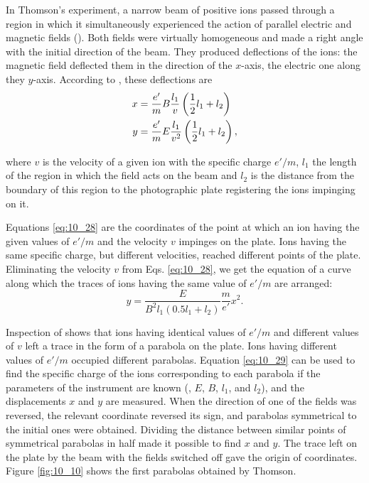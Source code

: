 In Thomson's experiment, a narrow beam of positive ions passed through a region in which it simultaneously experienced the action of parallel electric and magnetic fields ().
Both fields were virtually homogeneous and made a right angle with the initial direction of the beam.
They produced deflections of the ions: the magnetic
field deflected them in the direction of the $x$-axis, the electric one along they $y$-axis.
According to , these deflections
are
\begin{equation}\label{eq:10_28}
    \begin{split}
        x &= \frac{e'}{m} B \frac{l_1}{v} \left(\frac{1}{2} l_1 + l_2\right)\\
        y &= \frac{e'}{m} E \frac{l_1}{v^2} \left(\frac{1}{2} l_1 + l_2\right),
    \end{split}
\end{equation}

\noindent
where $v$ is the velocity of a given ion with the specific charge $e'/m$, $l_1$ the length of the region in which the field acts on the beam and $l_2$ is the distance from the boundary of this region to the photographic plate registering the ions impinging on it.

Equations \eqref{eq:10_28} are the coordinates of the point at which an ion having the given values of $e'/m$ and the velocity $v$ impinges on the plate.
Ions having the same specific charge, but different velocities, reached different points of the plate.
Eliminating the velocity $v$ from Eqs. \eqref{eq:10_28}, we get the equation of a curve along which the traces of ions having the same value of $e'/m$ are arranged:
\begin{equation}\label{eq:10_29}
    y = \frac{E}{B^2 l_1 (0.5 l_1 + l_2)} \frac{m}{e'} x^2.
\end{equation}

Inspection of  shows that ions having identical values of $e'/m$ and different values of $v$ left a trace in the form of a parabola on the plate.
Ions having different values of $e'/m$ occupied different parabolas.
Equation \eqref{eq:10_29} can be used to find the specific charge of the ions corresponding to each parabola if the parameters of the instrument are known (\ie, $E$, $B$, $l_1$, and $l_2$), and the displacements $x$ and $y$ are measured.
When the direction of one of the fields was reversed, the relevant coordinate reversed its sign, and parabolas symmetrical to the initial ones were obtained.
Dividing the distance between similar points of symmetrical parabolas in half made it possible to find $x$ and $y$.
The trace left on the plate by the beam with the fields switched off gave the origin of coordinates. Figure \ref{fig:10_10} shows the first parabolas obtained by Thomson.

